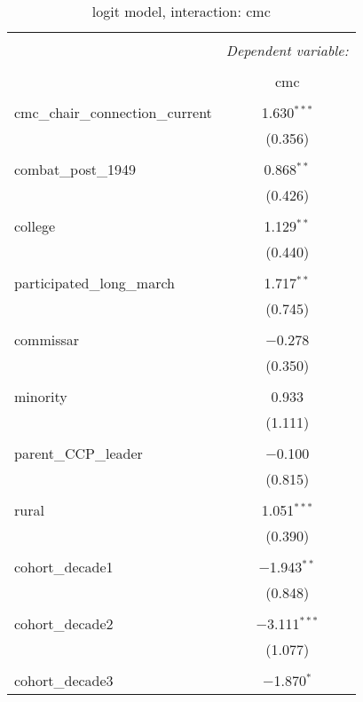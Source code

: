 \documentclass[12pt,letterpaper]{article}
\begin{document}
\begin{table}[!htbp] \centering 
	\caption{logit model, interaction: cmc} 
	\label{} 
	\begin{tabular}{@{\extracolsep{5pt}}lc} 
		\\[-1.8ex]\hline 
		\hline \\[-1.8ex] 
		& \multicolumn{1}{c}{\textit{Dependent variable:}} \\ 
		\cline{2-2} 
		\\[-1.8ex] & cmc \\ 
		\hline \\[-1.8ex] 
		cmc\_chair\_connection\_current & 1.630$^{***}$ \\ 
		& (0.356) \\ 
		& \\ 
		combat\_post\_1949 & 0.868$^{**}$ \\ 
		& (0.426) \\ 
		& \\ 
		college & 1.129$^{**}$ \\ 
		& (0.440) \\ 
		& \\ 
		participated\_long\_march & 1.717$^{**}$ \\ 
		& (0.745) \\ 
		& \\ 
		commissar & $-$0.278 \\ 
		& (0.350) \\ 
		& \\ 
		minority & 0.933 \\ 
		& (1.111) \\ 
		& \\ 
		parent\_CCP\_leader & $-$0.100 \\ 
		& (0.815) \\ 
		& \\ 
		rural & 1.051$^{***}$ \\ 
		& (0.390) \\ 
		& \\ 
		cohort\_decade1 & $-$1.943$^{**}$ \\ 
		& (0.848) \\ 
		& \\ 
		cohort\_decade2 & $-$3.111$^{***}$ \\ 
		& (1.077) \\ 
		& \\ 
		cohort\_decade3 & $-$1.870$^{*}$ \\ 

\end{tabular}
\end{table}
\end{document}
